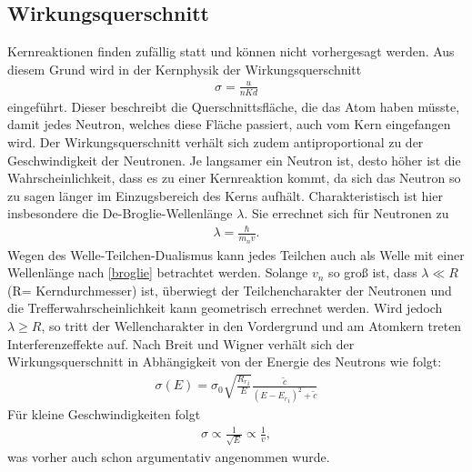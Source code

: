 	\subsection{Wirkungsquerschnitt}
Kernreaktionen finden zufällig statt und können nicht vorhergesagt werden. Aus diesem Grund wird in der Kernphysik der Wirkungsquerschnitt
\begin{align}
	\sigma= \frac{u}{nKd}
\end{align}
eingeführt. Dieser beschreibt die Querschnittsfläche, die das Atom haben müsste, damit jedes Neutron, welches diese Fläche passiert, auch vom Kern eingefangen wird. Der Wirkungsquerschnitt verhält sich zudem antiproportional zu der Geschwindigkeit der Neutronen. Je langsamer ein Neutron ist, desto höher ist die Wahrscheinlichkeit, dass es zu einer Kernreaktion kommt, da sich das Neutron so zu sagen länger im Einzugsbereich des Kerns aufhält. Charakteristisch ist hier insbesondere die De-Broglie-Wellenlänge $\lambda$. Sie errechnet sich für Neutronen zu
\begin{align}
	\lambda=\frac{\hbar}{m_n v}.
	\label{broglie}
\end{align}
Wegen des Welle-Teilchen-Dualismus kann jedes Teilchen auch als Welle mit einer Wellenlänge nach \ref{broglie} betrachtet werden. Solange $v_n$ so groß ist, dass $\lambda \ll R$ ({\small R= Kerndurchmesser}) ist, überwiegt der Teilchencharakter der Neutronen und die Trefferwahrscheinlichkeit kann geometrisch errechnet werden. Wird jedoch $\lambda \geq R$, so tritt der Wellencharakter in den Vordergrund und am Atomkern treten Interferenzeffekte auf. Nach Breit und Wigner verhält sich der Wirkungsquerschnitt in Abhängigkeit von der Energie des Neutrons wie folgt:
\begin{align}
	\sigma (E) = \sigma_0 \sqrt{\frac{{R_r}_i}{E}} \frac{\tilde c}{(E-{E_r}_i)^2 	+ \tilde c}
\end{align}
Für kleine Geschwindigkeiten folgt
\begin{align}
	\sigma \propto \frac{1}{\sqrt{E}} \propto \frac{1}{v},
\end{align}
was vorher auch schon argumentativ angenommen wurde.
